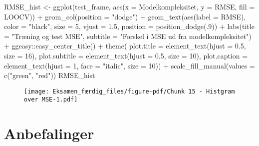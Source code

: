 \documentclass[
  12pt,
  a4paper,
  DIV=11,
  numbers=noendperiod,
  oneside,
  open=any]{scrartcl}
\newenvironment{Shaded}{\begin{snugshade}}{\end{snugshade}}
\newcommand{\AttributeTok}[1]{\textcolor[rgb]{0.40,0.45,0.13}{#1}}
\newcommand{\DecValTok}[1]{\textcolor[rgb]{0.68,0.00,0.00}{#1}}
\newcommand{\FloatTok}[1]{\textcolor[rgb]{0.68,0.00,0.00}{#1}}
\newcommand{\FunctionTok}[1]{\textcolor[rgb]{0.28,0.35,0.67}{#1}}
\newcommand{\NormalTok}[1]{\textcolor[rgb]{0.00,0.23,0.31}{#1}}
\newcommand{\OtherTok}[1]{\textcolor[rgb]{0.00,0.23,0.31}{#1}}
\newcommand{\SpecialCharTok}[1]{\textcolor[rgb]{0.37,0.37,0.37}{#1}}
\newcommand{\StringTok}[1]{\textcolor[rgb]{0.13,0.47,0.30}{#1}}
\begin{document}
\begin{Shaded}
\begin{Highlighting}[numbers=left,,]
\NormalTok{RMSE\_hist }\OtherTok{\textless{}{-}} \FunctionTok{ggplot}\NormalTok{(test\_frame, }\FunctionTok{aes}\NormalTok{(}\AttributeTok{x =}\NormalTok{ Modelkompleksitet, }\AttributeTok{y =}\NormalTok{ RMSE, }\AttributeTok{fill =}\NormalTok{ LOOCV)) }\SpecialCharTok{+} \FunctionTok{geom\_col}\NormalTok{(}\AttributeTok{position =} \StringTok{"dodge"}\NormalTok{) }\SpecialCharTok{+} 
  \FunctionTok{geom\_text}\NormalTok{(}\FunctionTok{aes}\NormalTok{(}\AttributeTok{label =}\NormalTok{ RMSE),}
            \AttributeTok{color =} \StringTok{"black"}\NormalTok{, }\AttributeTok{size =} \DecValTok{5}\NormalTok{,}
            \AttributeTok{vjust =} \FloatTok{1.5}\NormalTok{,}
            \AttributeTok{position =} \FunctionTok{position\_dodge}\NormalTok{(.}\DecValTok{9}\NormalTok{)) }\SpecialCharTok{+} 
 \FunctionTok{labs}\NormalTok{(}\AttributeTok{title =} \StringTok{"Træning og test MSE"}\NormalTok{,}
 \AttributeTok{subtitle =} \StringTok{"Forskel i MSE ud fra modelkompleksitet"}\NormalTok{) }\SpecialCharTok{+} 
\NormalTok{ ggeasy}\SpecialCharTok{::}\FunctionTok{easy\_center\_title}\NormalTok{() }\SpecialCharTok{+} 
 \FunctionTok{theme}\NormalTok{( }\AttributeTok{plot.title =} \FunctionTok{element\_text}\NormalTok{(}\AttributeTok{hjust =} \FloatTok{0.5}\NormalTok{, }\AttributeTok{size =} \DecValTok{16}\NormalTok{),}
 \AttributeTok{plot.subtitle =} \FunctionTok{element\_text}\NormalTok{(}\AttributeTok{hjust =} \FloatTok{0.5}\NormalTok{, }\AttributeTok{size =} \DecValTok{10}\NormalTok{), }
 \AttributeTok{plot.caption =} \FunctionTok{element\_text}\NormalTok{(}\AttributeTok{hjust =} \DecValTok{1}\NormalTok{, }\AttributeTok{face =} \StringTok{"italic"}\NormalTok{, }\AttributeTok{size =} \DecValTok{10}\NormalTok{)) }\SpecialCharTok{+} 
\FunctionTok{scale\_fill\_manual}\NormalTok{(}\AttributeTok{values =} \FunctionTok{c}\NormalTok{(}\StringTok{"green"}\NormalTok{, }\StringTok{"red"}\NormalTok{))}
\NormalTok{RMSE\_hist}
\end{Highlighting}
\end{Shaded}

\begin{figure}[H]

{\centering \texttt{[image: Eksamen\_færdig\_files/figure-pdf/Chunk 15 - Histgram over MSE-1.pdf]}

}

\end{figure}

\hypertarget{anbefalinger}{%
\section{Anbefalinger}\label{anbefalinger}}
\end{document}
